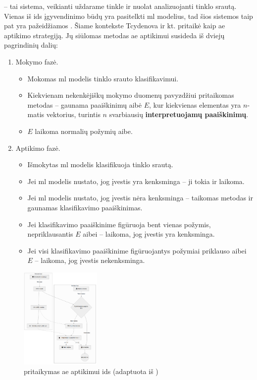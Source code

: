  -- tai sistema, veikianti uždarame tinkle ir nuolat analizuojanti tinklo srautą. Vienas iš \gls{ids} įgyvendinimo būdų yra pasitelkti \gls{ml} modelius, tad šios sistemos taip pat yra pažeidžiamos . Šiame kontekste Tcydenova ir kt. pritaikė \LIME kaip \gls{ae} aptikimo strategiją. Jų siūlomas metodas  \gls{ae} aptikimui susideda iš dviejų pagrindinių dalių:
\begin{enumerate}
    \item Mokymo fazė.
    \begin{itemize}
        \item Mokomas \gls{ml} modelis tinklo srauto klasifikavimui.
        \item Kiekvienam nekenkėjiškų mokymo duomenų pavyzdžiui pritaikomas \LIME metodas -- gaunama paaiškinimų aibė $E$, kur kiekvienas elementas yra $n$-matis vektorius, turintis $n$ svarbiausių \textbf{interpretuojamų paaiškinimų}.
        \item $E$ laikoma normalių požymių aibe.
    \end{itemize}
    \item Aptikimo fazė.
    \begin{itemize}
        \item Išmokytas \gls{ml} modelis klasifikuoja tinklo srautą.
        \item Jei \gls{ml} modelis nustato, jog įvestis yra kenksminga -- ji tokia ir laikoma.
        \item Jei \gls{ml} modelis nustato, jog įvestis nėra kenksminga -- taikomas \LIME metodas ir gaunamas klasifikavimo paaiškinimas.
        \item Jei klasifikavimo paaiškinime figūruoja bent vienas požymis, nepriklausantis $E$ aibei -- laikoma, jog įvestis yra kenksminga.
        \item Jei visi klasifikavimo paaiškinime figūruojantys požymiai priklauso aibei $E$ -- laikoma, jog įvestis nekenksminga.
    \end{itemize}
\end{enumerate}

\begin{figure}[h]
    \centering
    \includegraphics[width=0.35\textwidth]{images/ids.png}
    \caption{\LIME pritaikymas \gls{ae} aptikimui \gls{ids} (adaptuota iš \cite{tcydenovaDetectionAdversarialAttacks2021})}
    \label{fig:ids}
\end{figure}



